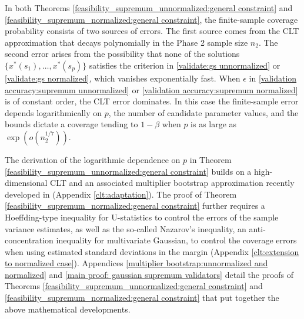 \documentclass[mnsc,blindrev]{informs4} %
\begin{document}
In both Theorems \ref{feasibility_supremum_unnormalized:general constraint} and \ref{feasibility_supremum_normalized:general constraint}, the finite-sample coverage probability consists of two sources of errors. The first source comes from the CLT approximation that decays polynomially in the Phase 2 sample size $n_2$. The second error arises from the possibility that none of the solutions $\{x^*(s_1),\ldots,x^*(s_p)\}$ satisfies the criterion in \eqref{validate:gs unnormalized} or \eqref{validate:gs normalized}, which vanishes exponentially fast. When $\epsilon$ in \eqref{validation accuracy:supremum unnormalized} or \eqref{validation accuracy:supremum normalized} is of constant order, the CLT error dominates. In this case the finite-sample error depends logarithmically on $p$, the number of candidate parameter values, and the bounds dictate a coverage tending to $1-\beta$ when $p$ is as large as $\exp(o(n_2^{1/7}))$.

The derivation of the logarithmic dependence on $p$ in Theorem \ref{feasibility_supremum_unnormalized:general constraint} builds on a high-dimensional CLT and an associated multiplier bootstrap approximation recently developed in \cite{chernozhukov2017central} (Appendix \ref{clt:adaptation}). The proof of Theorem \ref{feasibility_supremum_normalized:general constraint} further requires a Hoeffding-type inequality for U-statistics to control the errors of the sample variance estimates, as well as the so-called Nazarov's inequality, an anti-concentration inequality for multivariate Gaussian, to control the coverage errors when using estimated standard deviations in the margin (Appendix \ref{clt:extension to normalized case}). Appendices \ref{multiplier bootstrap:unnormalized and normalized} and \ref{main proof: gaussian supremum validators} detail the proofs of Theorems \ref{feasibility_supremum_unnormalized:general constraint} and \ref{feasibility_supremum_normalized:general constraint} that put together the above mathematical developments.
\end{document}
